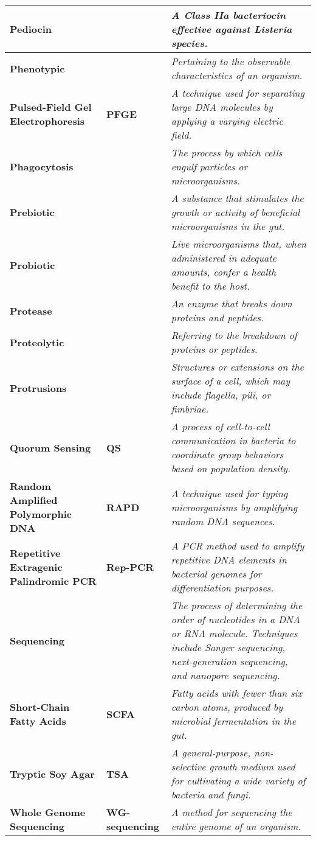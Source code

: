 \begin{longtable}{| p{5cm} | p{2cm} | p{7.5cm} |}
    \hline
    \textbf{Pediocin} &  & \textit{A Class IIa bacteriocin effective against \textit{Listeria} species.} \\
    \hline
    \textbf{Phenotypic} &  & \textit{Pertaining to the observable characteristics of an organism.} \\
    \hline
    \textbf{Pulsed-Field Gel Electrophoresis} & \textbf{PFGE} & \textit{A technique used for separating large DNA molecules by applying a varying electric field.} \\
    \hline
    \textbf{Phagocytosis} &  & \textit{The process by which cells engulf particles or microorganisms.} \\
    \hline
    \textbf{Prebiotic} &  & \textit{A substance that stimulates the growth or activity of beneficial microorganisms in the gut.} \\
    \hline
    \textbf{Probiotic} &  & \textit{Live microorganisms that, when administered in adequate amounts, confer a health benefit to the host.} \\
    \hline
    \textbf{Protease} &  & \textit{An enzyme that breaks down proteins and peptides.} \\
    \hline
    \textbf{Proteolytic} &  & \textit{Referring to the breakdown of proteins or peptides.} \\
    \hline
    \textbf{Protrusions} &  & \textit{Structures or extensions on the surface of a cell, which may include flagella, pili, or fimbriae.} \\
    \hline
    \textbf{Quorum Sensing} & \textbf{QS} & \textit{A process of cell-to-cell communication in bacteria to coordinate group behaviors based on population density.} \\
    \hline
    \textbf{Random Amplified Polymorphic DNA} & \textbf{RAPD} & \textit{A technique used for typing microorganisms by amplifying random DNA sequences.} \\
    \hline
    \textbf{Repetitive Extragenic Palindromic PCR} & \textbf{Rep-PCR} & \textit{A PCR method used to amplify repetitive DNA elements in bacterial genomes for differentiation purposes.} \\
    \hline
    \textbf{Sequencing} &  & \textit{The process of determining the order of nucleotides in a DNA or RNA molecule. Techniques include Sanger sequencing, next-generation sequencing, and nanopore sequencing.} \\
    \hline
    \textbf{Short-Chain Fatty Acids} & \textbf{SCFA} & \textit{Fatty acids with fewer than six carbon atoms, produced by microbial fermentation in the gut.} \\
    \hline
    \textbf{Tryptic Soy Agar} & \textbf{TSA} & \textit{A general-purpose, non-selective growth medium used for cultivating a wide variety of bacteria and fungi.} \\
    \hline
    \textbf{Whole Genome Sequencing} & \textbf{WG-sequencing} & \textit{A method for sequencing the entire genome of an organism.} \\
    \end{longtable}




